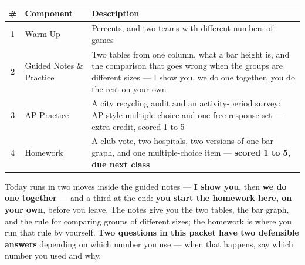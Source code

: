\documentclass[12pt]{article}
\begin{document}
\boxguard[14]
\begin{tocbox}
\small
\renewcommand{\arraystretch}{1.5}
\begin{tabularx}{\linewidth}{@{} c l X @{}}
\rowcolor{sky}
\textbf{\#} & \textbf{Component} & \textbf{Description} \\
\midrule
1 & Warm-Up & Percents, and two teams with different numbers of games \\
2 & Guided Notes \& Practice & Two tables from one column, what a bar height is, and the
                 comparison that goes wrong when the groups are different sizes --- I show you,
                 we do one together, you do the rest on your own \\
3 & AP Practice & A city recycling audit and an activity-period survey: AP-style multiple
                 choice and one free-response set --- extra credit, scored 1 to 5 \\
4 & Homework & A club vote, two hospitals, two versions of one bar graph, and one
                 multiple-choice item --- \textbf{scored 1 to 5, due next class} \\
\end{tabularx}
\end{tocbox}

\vspace{0.14in}

\boxguard[8]
\begin{remindbox}
\small
Today runs in two moves inside the guided notes --- \textbf{I show you}, then \textbf{we do one
together} --- and a third at the end: \textbf{you start the homework here, on your own}, before
you leave. The notes give you the two tables, the bar graph, and the rule for comparing groups of
different sizes; the homework is where you run that rule by yourself.
\textbf{Two questions in this packet have two defensible answers}
depending on which number you use --- when that happens, say which number you used and why.
\end{remindbox}
\end{document}

